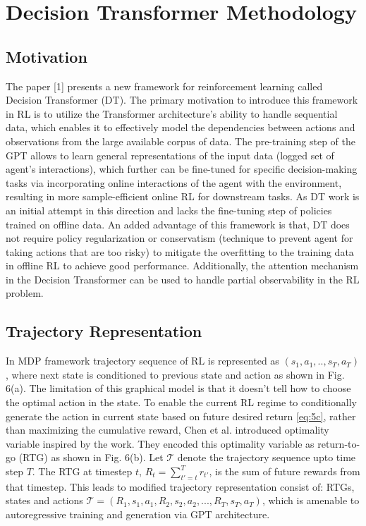 \documentclass[conference]{IEEEtran}
\begin{document}
\section{Decision Transformer Methodology}
\subsection{Motivation}
The paper [1] presents a new framework for reinforcement
learning called Decision Transformer (DT). The primary motivation
to introduce this framework in RL is to utilize the Transformer
architecture’s ability to handle sequential data, which enables it
to effectively model the dependencies between actions and
observations from the large available corpus of data. The pre-training
step of the GPT \cite{b10} allows to learn general representations
of the input data (logged set of agent’s interactions), which
further can be fine-tuned for specific decision-making tasks via
incorporating online interactions of the agent with the environment,
resulting in more sample-efficient online RL for downstream
tasks. As DT work is an initial attempt in this direction and lacks the fine-tuning step of policies trained on offline data. An added advantage of this framework is that,
DT does not require policy regularization or conservatism (technique to prevent agent for taking actions that are too risky)
to mitigate the overfitting to the training data in offline RL
to achieve good performance. Additionally, the attention
mechanism in the Decision Transformer can be used to handle
partial observability in the RL problem.

\subsection{Trajectory Representation}
In MDP framework trajectory sequence of RL is represented as \((s_1, a_1,..,s_T,a_T)\), where next state is conditioned to previous state and action as shown in Fig. 6(a). The limitation of this graphical 
 model is that it doesn’t tell how to choose the optimal action in the state.  To enable the current RL regime to conditionally generate the action in current state based on future desired return \eqref{eq:5c}, rather than maximizing the cumulative reward,  Chen et al.\cite{b1} introduced optimality variable inspired by the work\cite{b12}. They encoded this optimality variable as return-to-go (RTG) as shown in Fig. 6(b). Let \(\mathcal{T}\) denote the trajectory sequence upto time step \(T\). The RTG at timestep \(t\), \(R_{t} = \sum_{t'=t}^{T} r_{t'}\), is the sum of future rewards from that
timestep. This leads to modified trajectory representation consist of: RTGs, states and actions \(\mathcal{T}= (R_{1},s_{1},a_1,R_2,s_2,a_2,...,R_T,s_T,a_T) \), which is amenable to autoregressive training and generation via GPT architecture.
\end{document}
